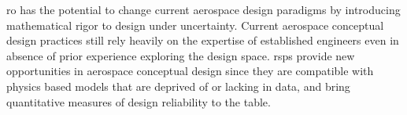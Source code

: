 \gls{ro} has the potential to change current aerospace design paradigms by introducing
mathematical rigor to design under uncertainty. Current aerospace
conceptual design practices still rely heavily on the expertise of established
engineers even in absence of prior experience exploring the design space.
\gls{rsp}s provide new opportunities in aerospace conceptual design
since they are compatible with physics based models
that are deprived of or lacking in data, and bring quantitative
measures of design reliability to the table.

